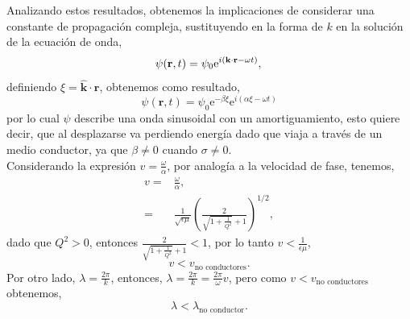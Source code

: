 \documentclass[11pt,fleqn]{book} %
\begin{document}
Analizando estos resultados, obtenemos la implicaciones de considerar una constante de propagaci\'on compleja, sustituyendo en la forma de $k$ en la soluci\'on de la ecuaci\'on de onda,
\begin{equation}
\psi(\textbf{r},t)=\psi_0\text{e}^{i(\textbf{k}\cdot\textbf{r}-\omega t)},\\
\end{equation}
definiendo $\xi=\hat{\textbf{k}}\cdot\textbf{r}$, obtenemos como resultado,
\begin{equation}
\psi(\textbf{r},t)=\psi_0\text{e}^{-\beta \xi}\text{e}^{i(\alpha \xi-\omega t)}
\end{equation}
por lo cual $\psi$ describe una onda sinusoidal con un amortiguamiento, esto quiere decir, que al desplazarse va perdiendo energ\'ia dado que viaja a trav\'es de un medio conductor, ya que $\beta\neq 0$ cuando $\sigma\neq 0$.\\
Considerando la expresi\'on $v=\frac{\omega}{\alpha}$, por analog\'ia a la velocidad de fase, tenemos,
\begin{equation}
\begin{split}
v=&\frac{\omega}{\alpha},\\
=&\frac{1}{\sqrt{\epsilon\mu}}\left( \frac{2}{\sqrt{1+\frac{1}{Q^2}}+1} \right)^{1/2},
\end{split}
\end{equation}
dado que $Q^2>0$, entonces $\frac{2}{\sqrt{1+\frac{1}{Q^2}}+1}<1$, por lo tanto $v<\frac{1}{\epsilon\mu}$,
\begin{equation}
v<v_{\text{no conductores}}.
\end{equation}
Por otro lado, $\lambda=\frac{2\pi}{k}$, entonces, $\lambda=\frac{2\pi}{k}=\frac{2\pi}{\omega}v$, pero como $v<v_{\text{no conductores}}$ obtenemos,
\begin{equation}
 \lambda<\lambda_{\text{no conductor}}.
 \end{equation}
\end{document}
